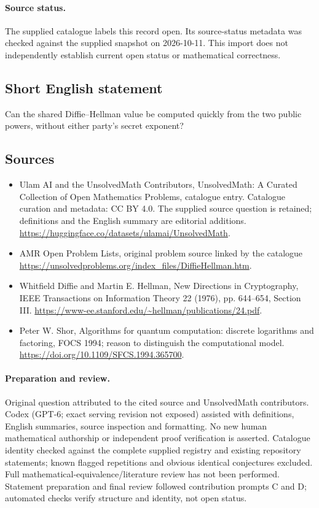 \documentclass[11pt]{article}
\begin{document}
\paragraph{Source status.}
The supplied catalogue labels this record open. Its source-status metadata was checked against the supplied snapshot on 2026-10-11. This import does not independently establish current open status or mathematical correctness.
\subsection{Short English statement}
Can the shared Diffie--Hellman value be computed quickly from the two public powers, without either party's secret exponent?
\subsection{Sources}
\begin{itemize}
\item[\hypertarget{source:statement:1}{S1}] Ulam AI and the UnsolvedMath Contributors, UnsolvedMath: A Curated Collection of Open Mathematics Problems, catalogue entry. Catalogue curation and metadata: CC BY 4.0. The supplied source question is retained; definitions and the English summary are editorial additions.
\url{https://huggingface.co/datasets/ulamai/UnsolvedMath}.
\item[\hypertarget{source:statement:2}{S2}] AMR Open Problem Lists, original problem source linked by the catalogue
\url{https://unsolvedproblems.org/index_files/DiffieHellman.htm}.
\item[\hypertarget{source:statement:3}{S3}] Whitfield Diffie and Martin E. Hellman, New Directions in Cryptography, IEEE Transactions on Information Theory 22 (1976), pp. 644--654, Section III.
\url{https://www-ee.stanford.edu/~hellman/publications/24.pdf}.
\item[\hypertarget{source:statement:4}{S4}] Peter W. Shor, Algorithms for quantum computation: discrete logarithms and factoring, FOCS 1994; reason to distinguish the computational model.
\url{https://doi.org/10.1109/SFCS.1994.365700}.
\end{itemize}
\paragraph{Preparation and review.}
Original question attributed to the cited source and UnsolvedMath contributors. Codex (GPT-6; exact serving revision not exposed) assisted with definitions, English summaries, source inspection and formatting. No new human mathematical authorship or independent proof verification is asserted. Catalogue identity checked against the complete supplied registry and existing repository statements; known flagged repetitions and obvious identical conjectures excluded. Full mathematical-equivalence/literature review has not been performed. Statement preparation and final review followed contribution prompts C and D; automated checks verify structure and identity, not open status.
\label{end:statement}
\end{document}
